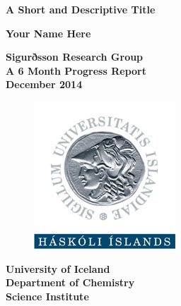 \documentclass[a4paper,oneside,12pt]{article}
\begin{document}

\begin{titlepage}

\begin{center}
\huge{\textbf{A Short and Descriptive Title}}
\end{center}

\vspace{1cm}
\thispagestyle{empty}

\begin{center}
\textbf{Your Name Here}

\vspace{1cm}
 
\textbf{Sigurðsson Research Group \\
A 6 Month Progress Report \\
December 2014}
\end{center}

\vspace{10cm}

\begin{figure}[h!]
	\begin{center}
		\includegraphics[scale=2]{figures/UIlogo}
	\end{center}
	\label{logo}
\end{figure}

\begin{center}
\textbf{University of Iceland \\
Department of Chemistry \\
Science Institute}
\end{center}

\end{titlepage}

\tableofcontents








\newpage
{} \label{bibliography}
\printbibliography[resetnumbers=true]

\newpage
{} \label{listoffig}
\listoffigures

\newpage
{} \label{listofschemes}
\listofschemes

\end{document}
